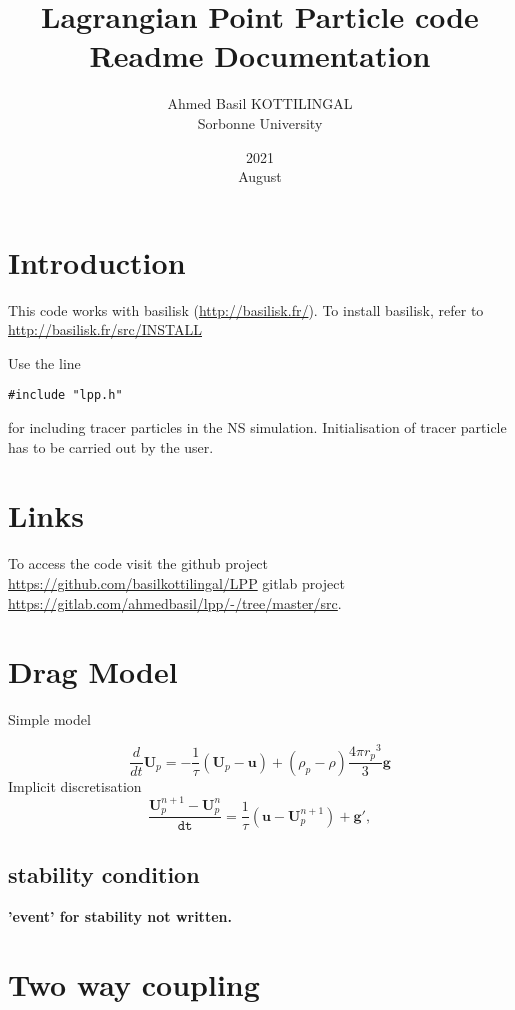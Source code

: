 \documentclass[a4paper,12pt]{article}
\title{Lagrangian Point Particle code Readme Documentation}
\date{2021\\ August}
\author{Ahmed Basil KOTTILINGAL\\ Sorbonne University}
\begin{document}
    
    \maketitle
    
    \section{Introduction}
    
    This code works with basilisk (\url{http://basilisk.fr/}). To install basilisk, refer to \url{http://basilisk.fr/src/INSTALL}
    
    Use the line
    \begin{lstlisting}[style=CStyle]
    #include "lpp.h" 
    \end{lstlisting}
    for including tracer particles in the NS simulation. 
    Initialisation of tracer particle has to be carried out by the user. 
    
    
    
    \section{Links}
    To access the code visit the 
    github project \url{https://github.com/basilkottilingal/LPP}
    gitlab project \url{https://gitlab.com/ahmedbasil/lpp/-/tree/master/src}.
    
    \section{Drag Model}
    
    Simple model
    
    $$\frac{d }{d t} \mathbf{U}_p = - \frac{1}{\tau}\left(\mathbf{U}_p - \mathbf{u}\right) + (\rho_p - \rho) \frac{4 \pi {r_p}^3}{3} \mathbf{g} $$
    Implicit discretisation
    $$\frac{\mathbf{U}_p^{n+1}-\mathbf{U}_p^n}{\mathtt{dt}} = \frac{1}{\tau}\left(\mathbf{u} - \mathbf{U}_p^{n+1}\right) + \mathbf{g}',$$
    
    \subsection{stability condition}
   \textbf{'event' for stability not written.}
    
    \section{Two way coupling}
\end{document}
